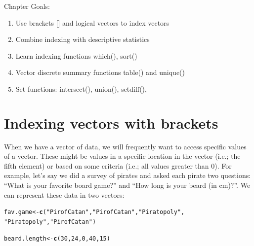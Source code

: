 \documentclass{tufte-book}\usepackage[]{graphicx}\usepackage[]{color}
\makeatletter
\newcommand{\hlnum}[1]{\textcolor[rgb]{0.686,0.059,0.569}{#1}}%
\newcommand{\hlstr}[1]{\textcolor[rgb]{0.192,0.494,0.8}{#1}}%
\newcommand{\hlstd}[1]{\textcolor[rgb]{0.345,0.345,0.345}{#1}}%
\newcommand{\hlkwb}[1]{\textcolor[rgb]{0.69,0.353,0.396}{#1}}%
\newcommand{\hlkwd}[1]{\textcolor[rgb]{0.737,0.353,0.396}{\textbf{#1}}}%
\newenvironment{kframe}{%
 \def\at@end@of@kframe{}%
 \ifinner\ifhmode%
  \def\at@end@of@kframe{\end{minipage}}%
  \begin{minipage}{\columnwidth}%
 \fi\fi%
 \def\FrameCommand##1{\hskip\@totalleftmargin \hskip-\fboxsep
 \colorbox{shadecolor}{##1}\hskip-\fboxsep
     \hskip-\linewidth \hskip-\@totalleftmargin \hskip\columnwidth}%
 \MakeFramed {\advance\hsize-\width
   \@totalleftmargin\z@ \linewidth\hsize
   \@setminipage}}%
 {\par\unskip\endMakeFramed%
 \at@end@of@kframe}
\newenvironment{knitrout}{}{} %
\makeatother
\begin{document}
Chapter Goals:

\begin{enumerate}
  \item Use brackets [] and logical vectors to index vectors
  \item Combine indexing with descriptive statistics
  \item Learn indexing functions which(), sort()
  \item Vector discrete summary functions table() and unique()
  \item Set functions: intersect(), union(), setdiff(), %
\end{enumerate}


\section{Indexing vectors with brackets}


When we have a vector of data, we will frequently want to access specific values of a vector. These might be values in a specific location in the vector (i.e.; the fifth element) or based on some criteria (i.e.; all values greater than 0). For example, let's say we did a survey of  pirates and asked each pirate two questions: ``What is your favorite board game?'' and ``How long is your beard (in cm)?''. We can represent these data in two vectors:

\begin{footnotesize}
\begin{knitrout}
\color{fgcolor}\begin{kframe}
\begin{alltt}
\hlstd{fav.game} \hlkwb{<-} \hlkwd{c}\hlstd{(}\hlstr{"Pir of Catan"}\hlstd{,} \hlstr{"Pir of Catan"}\hlstd{,} \hlstr{"Piratopoly"}\hlstd{,}
              \hlstr{"Piratopoly"}\hlstd{,} \hlstr{"Pir of Catan"}\hlstd{)}

\hlstd{beard.length} \hlkwb{<-} \hlkwd{c}\hlstd{(}\hlnum{30}\hlstd{,} \hlnum{24}\hlstd{,} \hlnum{0}\hlstd{,} \hlnum{40}\hlstd{,} \hlnum{15}\hlstd{)}
\end{alltt}
\end{kframe}
\end{knitrout}
\end{footnotesize}
\end{document}
